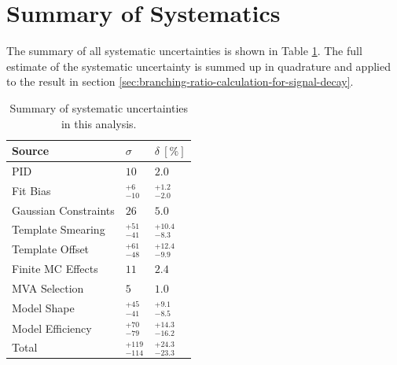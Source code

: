 \section{Summary of Systematics}

The summary of all systematic uncertainties is shown in Table \ref{tab:sys_summary}. The full estimate of the systematic uncertainty is summed up in quadrature and applied to the result in section \ref{sec:branching-ratio-calculation-for-signal-decay}.


\begin{table}[H]
	\centering
	\begin{tabular}{l|l|l}
		Source & $\sigma$ & $\delta~[\%]$ \\
		\toprule
		PID & $10$ & $2.0$ \\
		Fit Bias & $ {}^{+6}_{-10}$ & ${}^{+1.2}_{-2.0}$ \\
		Gaussian Constraints & $26$ & $5.0$ \\
		Template Smearing & ${}^{+51}_{-41}$ & ${}^{+10.4}_{-8.3}$ \\
		Template Offset & ${}^{+61}_{-48}$ & ${}^{+12.4}_{-9.9}$ \\
		Finite MC Effects & $11$ & $2.4$ \\
		MVA Selection & $5$ & $1.0$\\
		Model Shape & ${}^{+45}_{-41}$ & ${}^{+9.1}_{-8.5}$ \\
		Model Efficiency & ${}^{+70}_{-79}$ & ${}^{+14.3}_{-16.2}$ \\
		\midrule
		Total & ${} ^{+119}_{-114}$ & ${}^{+24.3}_{-23.3}$ \\
		\bottomrule
	\end{tabular}
	\captionsetup{width=0.8\linewidth}
	\caption{Summary of systematic uncertainties in this analysis.}
	\label{tab:sys_summary}
\end{table}







